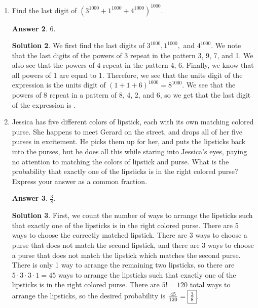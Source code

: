 \documentclass[11pt]{article}
\theoremstyle{definition}
\newtheorem*{solution}{Solution}
\newtheorem*{answer}{Answer}
\begin{document}
\begin{enumerate}
\begin{answer}
42.
\end{answer}
\begin{solution}
 There are 7 letters, so there are 7 ways to pick a space for the letter p and 6 ways to pick a space for the letter j. There is only 1 way to pick spaces for the remaining five letters, so there are $7 \cdot 6 \cdot 1 = \framebox{42}$ ways.
\end{solution}

\item %
Find the last digit of $(3^{1000} + 1^{1000} + 4^{1000})^{1000}$.

\begin{answer}
6.
\end{answer}
\begin{solution}
 We first find the last digits of $3^{1000}, 1^{1000},$ and $4^{1000}$. We note that the last digits of the powers of 3 repeat in the pattern 3, 9, 7, and 1. We also see that the powers of 4 repeat in the pattern 4, 6. Finally, we know that all powers of 1 are equal to 1. Therefore, we see that the units digit of the expression is the units digit of $(1+1+6)^{1000} = 8^{1000}$. We see that the powers of 8 repeat in a pattern of 8, 4, 2, and 6, so we get that the last digit of the expression is .
\end{solution}

\item %
Jessica has five different colors of lipstick, each with its own matching colored purse. She happens to meet Gerard on the street, and drops all of her five purses in excitement. He picks them up for her, and puts the lipsticks back into the purses, but he does all this while staring into Jessica's eyes, paying no attention to matching the colors of lipstick and purse. What is the probability that exactly one of the lipsticks is in the right colored purse? Express your answer as a common fraction.

\begin{answer}
$\frac{3}{8}$.
\end{answer}
\begin{solution}
 First, we count the number of ways to arrange the lipsticks such that exactly one of the lipsticks is in the right colored purse. There are 5 ways to choose the correctly matched lipstick. There are 3 ways to choose a purse that does not match the second lipstick, and there are 3 ways to choose a purse that does not match the lipstick which matches the second purse. There is only 1 way to arrange the remaining two lipsticks, so there are $5 \cdot 3 \cdot 3 \cdot 1 = 45$ ways to arrange the lipsticks such that exactly one of the lipsticks is in the right colored purse. There are $5! = 120$ total ways to arrange the lipsticks, so the desired probability is $\frac{45}{120} = \framebox{$\frac{3}{8}$}.$
\end{solution}


\end{enumerate}
\end{document}
